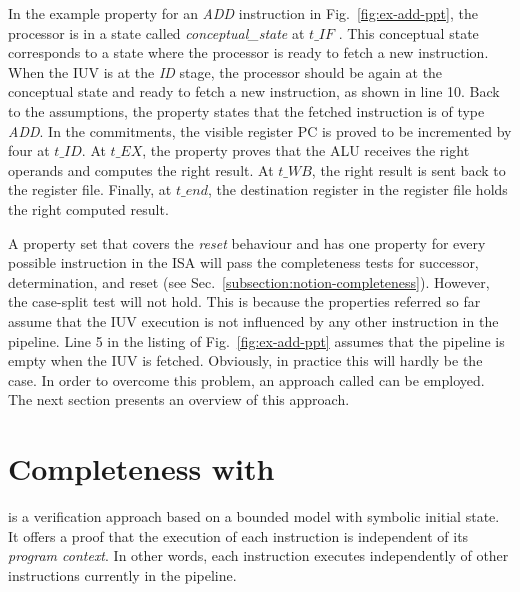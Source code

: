 In the example property for an \textit{ADD} instruction in Fig.~\ref{fig:ex-add-ppt}, the processor   is in a state called \textit{conceptual\_state} at $t\_IF$  . This conceptual state corresponds to a state where the processor is ready to fetch a new instruction. When the IUV is at the \textit{ID} stage, the processor should be again at the conceptual state and ready to fetch a new instruction, as shown in line 10. Back to the assumptions, the property states that the fetched instruction is of type \textit{ADD}. In the commitments, the visible register PC is proved to be incremented by four at $t\_ID$. At $t\_EX$, the property proves that the ALU receives the right operands and computes the right result. At $t\_WB$, the right result is sent back to the register file. Finally, at $t\_end$, the destination register in the register file holds the right computed result.

A property set that covers the \textit{reset} behaviour and has one property for every possible instruction in the ISA will pass the completeness tests for successor, determination, and reset (see Sec.~\ref{subsection:notion-completeness}). However, the case-split test will not hold. This is because the properties referred so far assume that the IUV execution is not influenced by any other instruction in the pipeline. Line 5 in the listing of Fig.~\ref{fig:ex-add-ppt} assumes that the pipeline is empty when the IUV is fetched. Obviously, in practice this will hardly be the case. In order to overcome this problem, an approach called \SSQED{} \cite{paper-symbolic} can be employed. The next section presents an overview of this approach.

\section{Completeness with \SSQED{}}
\label{section:s2qed}

\SSQED{} \cite{paper-symbolic} is a verification approach based on a bounded model with symbolic initial state. It offers a proof that the execution of each instruction is independent of its \textit{program context}. In other words, each instruction executes independently of other instructions currently in the pipeline. 

